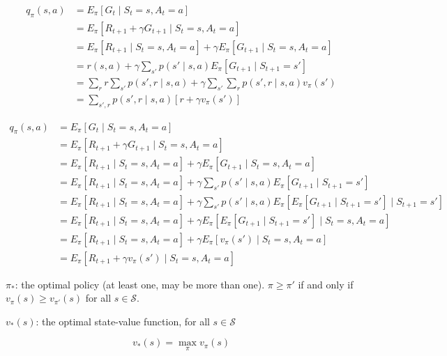 \documentclass{article}
\begin{document}
\begin{equation*}
\begin{split}
q_{\pi}(s, a)
& = E_{\pi}[G_t \mid S_t = s, A_t = a] \\
& = E_{\pi}[R_{t + 1} + \gamma G_{t + 1} \mid S_t = s, A_t = a] \\
& = E_{\pi}[R_{t + 1} \mid S_t = s, A_t = a] + \gamma E_{\pi}[G_{t + 1} \mid S_t = s, A_t = a] \\
& = r(s, a) + \gamma \sum_{s'} p(s' \mid s, a) E_{\pi}[G_{t + 1} \mid S_{t + 1} = s'] \\
& = \sum_r r \sum_{s'} p(s', r \mid s, a) + \gamma \sum_{s'} \sum_{r} p(s', r \mid s, a) v_{\pi}(s') \\
& = \sum_{s', r} p(s', r \mid s, a) [r + \gamma v_{\pi}(s')]
\end{split}
\end{equation*}

\begin{equation*}
\begin{split}
q_{\pi}(s, a)
& = E_{\pi}[G_t \mid S_t = s, A_t = a] \\
& = E_{\pi}[R_{t + 1} + \gamma G_{t + 1} \mid S_t = s, A_t = a] \\
& = E_{\pi}[R_{t + 1} \mid S_t = s, A_t = a] + \gamma E_{\pi}[G_{t + 1} \mid S_t = s, A_t = a] \\
& = E_{\pi}[R_{t + 1} \mid S_t = s, A_t = a] + \gamma \sum_{s'} p(s' \mid s, a) E_{\pi}[G_{t + 1} \mid S_{t + 1} = s'] \\
& = E_{\pi}[R_{t + 1} \mid S_t = s, A_t = a] + \gamma \sum_{s'} p(s' \mid s, a) E_{\pi}[E_{\pi}[G_{t + 1} \mid S_{t + 1} = s'] \mid S_{t + 1} = s'] \\
& = E_{\pi}[R_{t + 1} \mid S_t = s, A_t = a] + \gamma E_{\pi}[E_{\pi}[G_{t + 1} \mid S_{t + 1} = s'] \mid S_t = s, A_t = a] \\
& = E_{\pi}[R_{t + 1} \mid S_t = s, A_t = a] + \gamma E_{\pi}[v_{\pi}(s') \mid S_t = s, A_t = a] \\
& = E_{\pi}[R_{t + 1} + \gamma v_{\pi}(s') \mid S_t = s, A_t = a]
\end{split}
\end{equation*}

\(\pi_*\): the optimal policy (at least one, may be more than one). \(\pi \geq \pi'\) if and only if \(v_{\pi}(s) \geq v_{\pi'}(s)\) for all \(s \in \mathcal{S}\). 

\(v_*(s)\): the optimal state-value function, for all \(s \in \mathcal{S}\)

\[v_*(s) = \max_{\pi} v_{\pi}(s) \]
\end{document}
